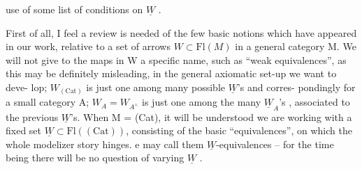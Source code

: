 use of some list of conditions on $\underline{W}$ .

F\unsure{\hand{$\dagger$}}irst of all, I feel a review is needed of the 
few basic notions which have appeared in our work, relative to a set
of arrows $W\subset \mathrm{Fl}(M)$ in a general category M. We will not give to the
maps in W a specific name, such as ``weak equivalences'', as this may be
definitely misleading, in the general axiomatic set-up we want to deve-%
lop;  $W_{(\mathrm{Cat})}$ is just one among many possible $\underline{W}$'s  and corres-%
pondingly for a small category A\unsure{\over{;}{,}}; $W_A = W_{A^{\wedge}}$ is just one among the many
$\underline{W}_A$'s , associated to the previous $\underline{W}$'s. When M = (Cat), it will be
understood we are working with a fixed set $\underline{W}\subset \mathrm{Fl}((\mathrm{Cat}))$, consisting of
the basic ``equivalences'', on which the whole modelizer story hinges.
e may call them $\underline{W}$-equivalences -- for the time being there will be no
question of varying $\underline{W}$ .

